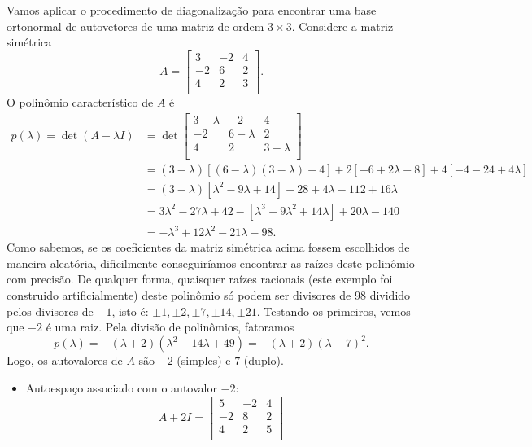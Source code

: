 \documentclass[../livro.tex]{subfiles}
\begin{document}
\begin{example}
	Vamos aplicar o procedimento de diagonalização para encontrar uma base ortonormal de autovetores de uma matriz de ordem $3 \times 3$. Considere a matriz simétrica
	\[
	A = 
	\begin{bmatrix}
	3 & -2 & 4 \\  
	-2 & 6 & 2 \\
	4 & 2 & 3 \\
	\end{bmatrix}.
	\] O polinômio característico de $A$ é 
          \begin{align*}
	p(\lambda) = \det (A - \lambda I ) & = 
	\det 
	\begin{bmatrix}
	3- \lambda & -2 & 4 \\  
	-2 & 6- \lambda & 2 \\
	4 & 2 & 3- \lambda \\
	\end{bmatrix} \\
	& = (3-\lambda) \left[ (6 - \lambda)(3 - \lambda) - 4 \right] + 2 \left[ -6 + 2 \lambda - 8 \right]  + 4 \left[ - 4 - 24 + 4 \lambda \right]  \\
	& = (3-\lambda) \left[ \lambda^2 - 9 \lambda + 14 \right] -28 + 4 \lambda - 112 + 16 \lambda  \\
	& = 3\lambda^2 - 27 \lambda + 42  - \left[ \lambda^3 - 9 \lambda^2 + 14 \lambda \right] + 20 \lambda - 140  \\
	& = -\lambda^3 + 12 \lambda^2 - 21 \lambda - 98.
          \end{align*}
 Como sabemos, se os coeficientes da matriz simétrica acima fossem escolhidos de maneira aleatória, dificilmente conseguiríamos encontrar as raízes deste polinômio com precisão. De qualquer forma, quaisquer raízes racionais (este exemplo foi construido artificialmente) deste polinômio só podem ser divisores de $98$ dividido pelos divisores de $-1$, isto é: $\pm 1, \pm 2, \pm 7, \pm 14, \pm 21$. Testando os primeiros, vemos que $-2$ é uma raiz. Pela divisão de polinômios, fatoramos
	\[
	p(\lambda) = -(\lambda + 2) (\lambda^2 - 14 \lambda + 49) = -(\lambda + 2)(\lambda - 7)^2.
	\] Logo, os autovalores de $A$ são $-2$ (simples) e $7$ (duplo).
	\begin{itemize}
		\item Autoespaço associado com o autovalor $-2$:
		\[
		A + 2 I = 
		\begin{bmatrix}
		5 & -2 & 4 \\  
		-2 & 8 & 2 \\
		4 & 2 & 5 \\

\end{bmatrix}\]
\end{itemize}
\end{example}
\end{document}

